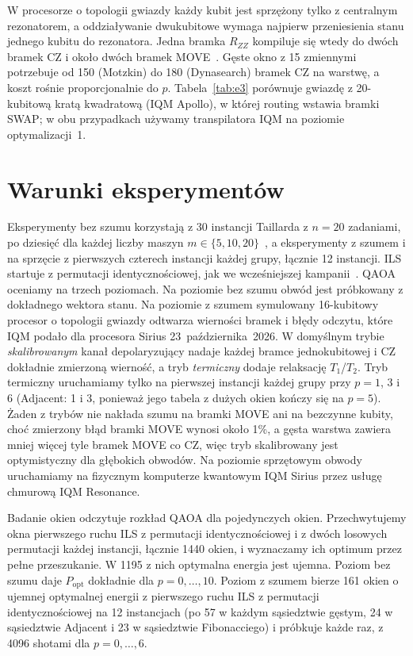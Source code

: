 \documentclass[runningheads]{llncs}
\begin{document}
W procesorze o topologii gwiazdy każdy kubit jest sprzężony tylko
z centralnym rezonatorem, a oddziaływanie dwukubitowe wymaga najpierw
przeniesienia stanu jednego kubitu do rezonatora. Jedna bramka $R_{ZZ}$
kompiluje się wtedy do dwóch bramek CZ i około dwóch bramek
MOVE~\cite{gnatowski2026routing}. Gęste okno z 15 zmiennymi potrzebuje od 150
(Motzkin) do 180 (Dynasearch) bramek CZ na warstwę, a koszt rośnie
proporcjonalnie do $p$. Tabela~\ref{tab:e3} porównuje gwiazdę z 20-kubitową
kratą kwadratową (IQM Apollo), w której routing wstawia bramki SWAP; w obu
przypadkach używamy transpilatora IQM na poziomie optymalizacji~1.

\section{Warunki eksperymentów}

Eksperymenty bez szumu korzystają z 30 instancji Taillarda z $n = 20$
zadaniami, po dziesięć dla każdej liczby maszyn
$m \in \{5, 10, 20\}$~\cite{taillard1993}, a eksperymenty z szumem i na
sprzęcie z pierwszych czterech instancji każdej grupy, łącznie 12 instancji.
ILS startuje z permutacji identycznościowej, jak we wcześniejszej
kampanii~\cite{wojewodzki2026aciids}. QAOA oceniamy na trzech poziomach. Na
poziomie bez szumu obwód jest próbkowany z dokładnego wektora stanu. Na
poziomie z szumem symulowany 16-kubitowy procesor o topologii gwiazdy
odtwarza wierności bramek i błędy odczytu, które IQM podało dla procesora
Sirius 23~października~2026. W domyślnym trybie \emph{skalibrowanym} kanał
depolaryzujący nadaje każdej bramce jednokubitowej i CZ dokładnie zmierzoną
wierność, a tryb \emph{termiczny} dodaje relaksację $T_1$/$T_2$. Tryb termiczny uruchamiamy
tylko na pierwszej instancji każdej grupy przy $p = 1$, 3 i 6 (Adjacent: 1 i 3, ponieważ jego tabela z dużych okien kończy się na $p = 5$). Żaden z trybów
nie nakłada szumu na bramki MOVE ani na bezczynne kubity, choć zmierzony
błąd bramki MOVE wynosi około 1\%, a gęsta warstwa zawiera mniej więcej tyle
bramek MOVE co CZ, więc tryb skalibrowany jest optymistyczny dla głębokich
obwodów. Na poziomie sprzętowym obwody uruchamiamy na fizycznym komputerze
kwantowym IQM Sirius przez usługę chmurową IQM Resonance.

Badanie okien odczytuje rozkład QAOA dla pojedynczych okien. Przechwytujemy
okna pierwszego ruchu ILS z permutacji identycznościowej i z dwóch losowych
permutacji każdej instancji, łącznie 1440 okien, i wyznaczamy ich optimum
przez pełne przeszukanie. W 1195 z nich optymalna energia jest ujemna. Poziom
bez szumu daje $P_{\mathrm{opt}}$ dokładnie dla $p = 0, \dots, 10$. Poziom
z szumem bierze 161 okien o ujemnej optymalnej energii z pierwszego ruchu ILS z permutacji identycznościowej na 12 instancjach (po
57 w każdym sąsiedztwie gęstym, 24 w sąsiedztwie Adjacent i 23
w sąsiedztwie Fibonacciego) i próbkuje każde raz, z 4096 shotami
dla $p = 0, \dots, 6$.
\end{document}
